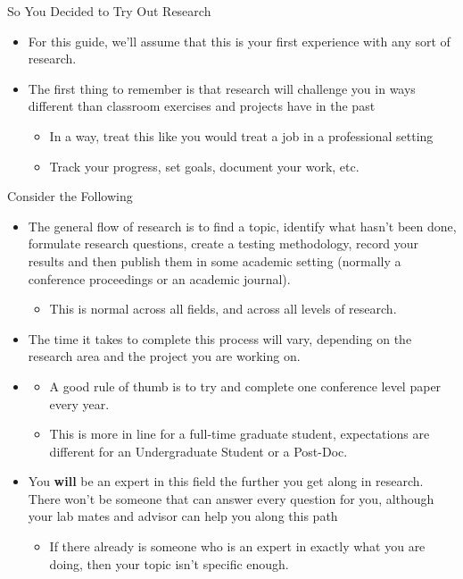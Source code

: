 \documentclass[handout]{beamer}
\begin{document}
\begin{frame}{So You Decided to Try Out Research}
\begin{itemize}
  \item For this guide, we'll assume that this is your first experience with any sort of research. 
  \item The first thing to remember is that research will challenge you in ways different than classroom exercises and projects have in the past
  \begin{itemize}
      \item In a way, treat this like you would treat a job in a professional setting
      \item Track your progress, set goals, document your work, etc.
  \end{itemize}
\end{itemize}
\end{frame}

\begin{frame}{Consider the Following}
\begin{itemize}
  \item The general flow of research is to find a topic, identify what hasn't been done, formulate research questions, create a testing methodology, record your results and then publish them in some academic setting (normally a conference proceedings or an academic journal).
  \begin{itemize}
      \item This is normal across all fields, and across all levels of research. 
  \end{itemize}
  \item The time it takes to complete this process will vary, depending on the research area and the project you are working on. 
  \item \begin{itemize}
      \item A good rule of thumb is to try and complete one conference level paper every year.
      \item This is more in line for a full-time graduate student, expectations are different for an Undergraduate Student or a Post-Doc.
  \end{itemize}
  \item You \textbf{will} be an expert in this field the further you get along in research. There won't be someone that can answer every question for you, although your lab mates and advisor can help you along this path
  \begin{itemize}
      \item If there already is someone who is an expert in exactly what you are doing, then your topic isn't specific enough.
  \end{itemize}
\end{itemize}
\end{frame}
\end{document}
